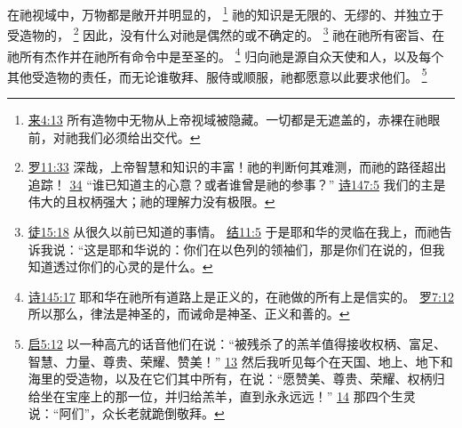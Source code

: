 \documentclass[12pt, a4paper, oneside]{ctexart}
\begin{document}
	在祂视域中，万物都是敞开并明显的，
	\footnote {
		\href{https://biblehub.com/hebrews/4-13.htm}{来4:13} 所有造物中无物从上帝视域被隐藏。一切都是无遮盖的，赤裸在祂眼前，对祂我们必须给出交代。
	}
	祂的知识是无限的、无缪的、并独立于受造物的，
	\footnote {
		\href{https://biblehub.com/romans/11-33.htm}{罗11:33} 深哉，上帝智慧和知识的丰富！祂的判断何其难测，而祂的路径超出追踪！
		\href{https://biblehub.com/romans/11-34.htm}{34} “谁已知道主的心意？或者谁曾是祂的参事？”
		\href{https://biblehub.com/psalms/147-5.htm}{诗147:5} 我们的主是伟大的且权柄强大；祂的理解力没有极限。
	}
	因此，没有什么对祂是偶然的或不确定的。
	\footnote {
		\href{https://biblehub.com/acts/15-18.htm}{徒15:18} 从很久以前已知道的事情。
		\href{https://biblehub.com/ezekiel/11-5.htm}{结11:5} 于是耶和华的灵临在我上，而祂告诉我说：“这是耶和华说的：你们在以色列的领袖们，那是你们在说的，但我知道透过你们的心灵的是什么。
	}
	祂在祂所有密旨、在祂所有杰作并在祂所有命令中是至圣的。
	\footnote {
		\href{https://biblehub.com/psalms/145-17.htm}{诗145:17} 耶和华在祂所有道路上是正义的，在祂做的所有上是信实的。
		\href{https://biblehub.com/romans/7-12.htm}{罗7:12} 所以那么，律法是神圣的，而诫命是神圣、正义和善的。
	}
	归向祂是源自众天使和人，以及每个其他受造物的责任，而无论谁敬拜、服侍或顺服，祂都愿意以此要求他们。
	\footnote {
		\href{https://biblehub.com/revelation/5-12.htm}{启5:12} 以一种高亢的话音他们在说：“被残杀了的羔羊值得接收权柄、富足、智慧、力量、尊贵、荣耀、赞美！”
		\href{https://biblehub.com/revelation/5-13.htm}{13} 然后我听见每个在天国、地上、地下和海里的受造物，以及在它们其中所有，在说：“愿赞美、尊贵、荣耀、权柄归给坐在宝座上的那一位，并归给羔羊，直到永永远远！”
		\href{https://biblehub.com/revelation/5-14.htm}{14} 那四个生灵说：“阿们”，众长老就跪倒敬拜。
	}
	
\end{document}

